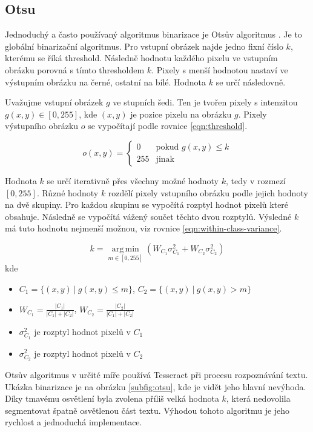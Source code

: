 \documentclass[thesis=B,czech]{FITthesis}[2019/12/23]
\DeclareMathOperator*{\argmin}{arg\,min}
\begin{document}
\subsection{Otsu}
Jednoduchý a často používaný algoritmus binarizace je Otsův algoritmus \cite{Otsu1979a}. Je to globální binarizační algoritmus. Pro vstupní obrázek najde jedno fixní číslo $k$, kterému se říká threshold. Následně hodnotu každého pixelu ve vstupním obrázku porovná s tímto thresholdem $k$. Pixely s menší hodnotou nastaví ve výstupním obrázku na černé, ostatní na bílé. Hodnota $k$ se určí následovně.

Uvažujme vstupní obrázek $g$ ve stupních šedi. Ten je tvořen pixely s intenzitou $g(x,y) \in [0, 255]$, kde $(x,y)$ je pozice pixelu na obrázku $g$. Pixely výstupního obrázku $o$ se vypočítají podle rovnice \ref{eqn:threshold}.

\begin{equation}
	\label{eqn:threshold}
	o(x,y)=
	\begin{cases}
		0   & \text{pokud } g(x,y)\leq k \\
		255 & \text{jinak}
	\end{cases}
\end{equation}

Hodnota $k$ se určí iterativně přes všechny možné hodnoty $k$, tedy v rozmezí $[0,255]$. Různé hodnoty $k$ rozdělí pixely vstupního obrázku podle jejich hodnoty na dvě skupiny. Pro každou skupinu se vypočítá rozptyl hodnot pixelů které obsahuje. Následně se vypočítá vážený součet těchto dvou rozptylů. Výsledné $k$ má tuto hodnotu nejmenší možnou, viz rovnice \ref{eqn:within-class-variance}.

\begin{equation}
	\label{eqn:within-class-variance}
	k = \argmin\limits_{m \in [0,255]}\left( W_{C_1} \sigma_{C_1}^2 +  W_{C_2} \sigma_{C_2}^2 \right)
\end{equation}
kde
\begin{itemize}[label=]
	\item $C_1=\{(x, y)\ |\ g(x,y) \leq m\}$, $C_2=\{(x, y)\ |\ g(x,y) > m\}$
	\item $W_{C_1} = \frac{|C_1|}{|C_1| + |C_2|}$, $W_{C_2} = \frac{|C_2|}{|C_1| + |C_2|}$
	\item $\sigma_{C_1}^2$ je rozptyl hodnot pixelů v $C_1$
	\item $\sigma_{C_2}^2$ je rozptyl hodnot pixelů v $C_2$
\end{itemize}

Otsův algoritmus v určité míře používá Tesseract při procesu rozpoznávání textu. Ukázka binarizace je na obrázku \ref{subfig:otsu}, kde je vidět jeho hlavní nevýhoda. Díky tmavému osvětlení byla zvolena příliš velká hodnota $k$, která nedovolila segmentovat špatně osvětlenou část textu. Výhodou tohoto algoritmu je jeho rychlost a jednoduchá implementace.
\end{document}
